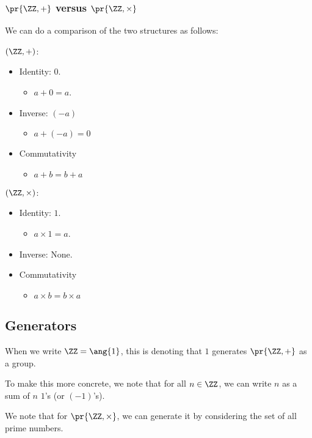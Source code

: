 \documentclass[openany]{book}
\begin{document}
\subsubsection{$\pr{\ZZ, +}$ versus $\pr{\ZZ, \times}$}
We can do a comparison of the two structures as follows:
\begin{multicols}{2}
	$(\ZZ, +)$:
	\begin{itemize}
		\item Identity: $0$.
		\begin{itemize}
			\item $a + 0 = a$.
		\end{itemize}
		\item Inverse: $(-a)$
		\begin{itemize}
			\item $a + (-a) = 0$
		\end{itemize}
		\item Commutativity
		\begin{itemize}
			\item $a + b = b + a$
		\end{itemize}
	\end{itemize}
	
	$(\ZZ, \times)$:
	\begin{itemize}
		\item Identity: $1$.
		\begin{itemize}
			\item $a \times 1 = a$.
		\end{itemize}
		\item Inverse: None.
		\item Commutativity
		\begin{itemize}
			\item $a \times b = b \times a$
		\end{itemize}
	\end{itemize}
\end{multicols}

\subsection{Generators}
When we write $\ZZ = \ang{1}$, this is denoting that $1$ generates $\pr{\ZZ, +}$ as a group.

To make this more concrete, we note that for all $n \in \ZZ$, we can write $n$ as a sum of $n$ $1$'s (or $(-1)$'s).

We note that for $\pr{\ZZ, \times}$, we can generate it by considering the set of all prime numbers.
\end{document}
